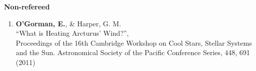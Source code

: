 \begin{flushleft}
{\large \textbf{Non-refereed}}
\end{flushleft}

\begin{enumerate}
\item \textbf{O'Gorman, E.}, \& Harper, G. M.\\
``What is Heating Arcturus' Wind?'', \\
Proceedings of the 16th Cambridge Workshop on Cool Stars, Stellar Systems and the Sun. 
Astronomical Society of the Pacific Conference Series, 448, 691 (2011)
\end{enumerate}


